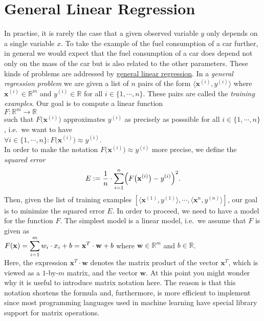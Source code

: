 \section{General Linear Regression}
In practise, it is rarely the case that a given observed variable $y$ only depends on a single variable $x$.
To take the example of the fuel consumption of a car further, in general we would expect that the fuel consumption
of a car does depend not only on the mass of the car but is also related to the other parameters.  These kinds
of problems are addressed by  
\href{https://en.wikipedia.org/wiki/Linear_regression}{general linear regression}.
In a \emph{general regression problem} we are given a list of $n$ pairs of the form $\langle\mathbf{x}^{(i)}, y^{(i)} \rangle$ 
where $\mathbf{x}^{(i)} \in \mathbb{R}^m$ and $y^{(i)} \in \mathbb{R}$ for all $i \in \{1,\cdots,n\}$.  These pairs are called the \emph{training examples}.
Our goal is to compute a linear function 
\\[0.2cm]
\hspace*{1.3cm}
$F:\mathbb{R}^m \rightarrow \mathbb{R}$
\\[0.2cm]  
such that $F\bigl(\mathbf{x}^{(i)}\bigr)$ approximates  $y^{(i)}$ as precisely as posssible
for all $i\in\{1,\cdots,n\}$, i.e.~we want to have
\\[0.2cm]
\hspace*{1.3cm}
$\forall i\in\{1,\cdots,n\}:F\bigl(\mathbf{x}^{(i)}\bigr) \approx y^{(i)}$.
\\[0.2cm]
In order to make the notation $F\bigl(\mathbf{x}^{(i)}\bigr) \approx y^{(i)}$ more precise, we
define the \emph{squared error} 
\begin{equation}
  \label{eq:squared-error-1}
  E := \frac{1}{n} \cdot \sum\limits_{i=1}^n \Bigl(F\bigl(\mathbf{x}^{(i)}\bigr) - y^{(i)}\Bigr)^2. 
\end{equation}
Then, given the list of training examples $[\langle \mathbf{x}^{(1)}, y^{(1)} \rangle, \cdots, \langle
\mathbf{x}^{n}, y^{(n)} \rangle]$, our goal is to minimize the squared error $E$.  
In order to proceed, we need to have a model for the function $F$.  The simplest model is a linear
model, i.e.~we assume that $F$ is given as 
\\[0.2cm]
\hspace*{1.3cm}
$\displaystyle F(\mathbf{x}) = \sum\limits_{i=1}^m w_i \cdot x_i + b = \mathbf{x}^T \cdot \mathbf{w} + b$ \quad where $\mathbf{w} \in \mathbb{R}^m$ and $b\in\mathbb{R}$.
\\[0.2cm]
Here, the expression $\mathbf{x}^T \cdot \mathbf{w}$ denotes the matrix product of the vector
$\mathbf{x}^T$, which is viewed as a $1$-by-$m$ matrix, and the vector $\mathbf{w}$.
At this point you might wonder why it is useful to introduce matrix notation here.  The reason is
that this notation shortens the formula and, furthermore, is more efficient to implement since most
programming languages used in machine learning have special library support for matrix operations.

